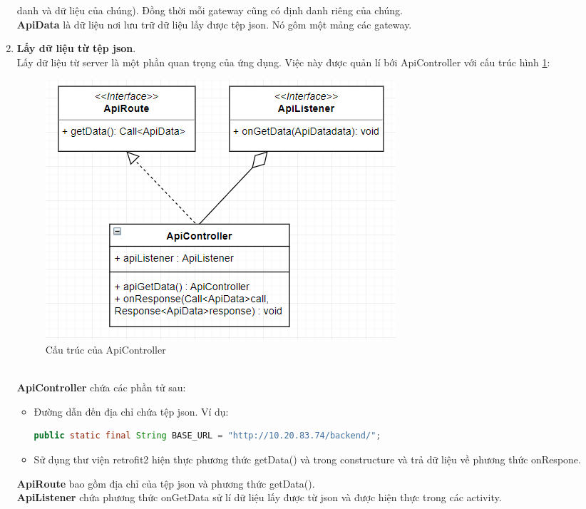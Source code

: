 \documentclass[a4paper]{article}
\begin{document}
\begin{enumerate}
			danh và dữ liệu của chúng). Đồng thời mỗi gateway cũng có định danh riêng của chúng.\\
			 \textbf{ApiData} là dữ liệu nơi lưu trữ dữ liệu lấy được tệp json. Nó gôm một mảng các gateway.\\
		\item \textbf{Lấy dữ liệu từ tệp json}.\\
			Lấy dữ liệu từ server là một phần quan trọng của ứng dụng. Việc này được quản lí bới ApiController với cấu trúc hình 				 \ref{fig:ApiGetDataDiagramApp}:\\
			\begin{figure}[htp]
	    			\centering
	   			 \includegraphics[scale=0.75]{ApiGetDataDiagram.PNG}
	   			 \caption{Cấu trúc của ApiController}
	   			 \label{fig:ApiGetDataDiagramApp}
			\end{figure}\\
			\textbf{ApiController} chứa các phần tử sau:
			\begin{itemize} 
				\item Đường dẫn đến địa chỉ chứa tệp json. Ví dụ: \\
				\begin{lstlisting}[language=Java]
public static final String BASE_URL = "http://10.20.83.74/backend/";
				\end{lstlisting}
				\item Sử dụng thư viện retrofit2 hiện thực phương thức getData() và trong constructure và trả dữ liệu về 						phương thức onRespone. 
			\end{itemize} 
			\textbf{ApiRoute} bao gồm địa chỉ của tệp json và phương thức getData().\\
			\textbf{ApiListener} chứa phương thức onGetData sử lí dữ liệu lấy được từ json và được hiện thực trong các 					activity.
		\end{enumerate}
\end{document}

